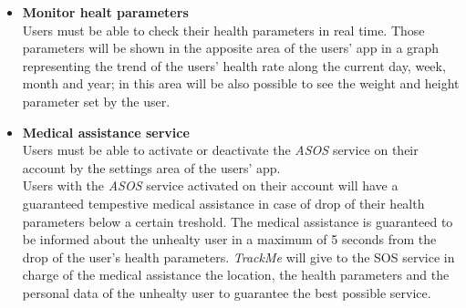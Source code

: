 \begin {itemize}
	\item {\textbf{Monitor healt parameters}\\ Users must be able to check their health parameters in real time. Those parameters will be shown in the apposite area of the users' app in a graph representing the trend of the users' health rate along the current day, week, month and year; in this area will be also possible to see the weight and height parameter set by the user. }

	\item {\textbf{Medical assistance service}\\ Users must be able to activate or deactivate the \textit{ASOS} service on their account by the settings area of the users' app. \\ Users with the \textit{ASOS} service activated on their account will have a guaranteed tempestive medical assistance in case of drop of their health parameters below a certain treshold. The medical assistance is guaranteed to be informed about the unhealty user in a maximum of 5 seconds from the drop of the user's health parameters. \textit{TrackMe} will give to the SOS service in charge of the medical assistance the location, the health parameters and the personal data of the unhealty user to guarantee the best possible service.}
		

\end {itemize}